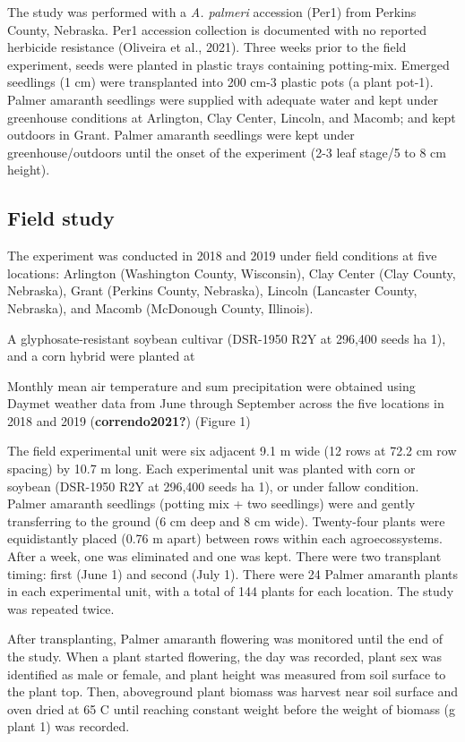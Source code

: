 \documentclass[utf8]{frontiersSCNS}
\begin{document}
The study was performed with a \emph{A. palmeri} accession (Per1) from
Perkins County, Nebraska. Per1 accession collection is documented with
no reported herbicide resistance (Oliveira et al., 2021). Three weeks
prior to the field experiment, seeds were planted in plastic trays
containing potting-mix. Emerged seedlings (1 cm) were transplanted into
200 cm-3 plastic pots (a plant pot-1). Palmer amaranth seedlings were
supplied with adequate water and kept under greenhouse conditions at
Arlington, Clay Center, Lincoln, and Macomb; and kept outdoors in Grant.
Palmer amaranth seedlings were kept under greenhouse/outdoors until the
onset of the experiment (2-3 leaf stage/5 to 8 cm height).

\hypertarget{field-study}{%
\subsection*{Field study}\label{field-study}}

The experiment was conducted in 2018 and 2019 under field conditions at
five locations: Arlington (Washington County, Wisconsin), Clay Center
(Clay County, Nebraska), Grant (Perkins County, Nebraska), Lincoln
(Lancaster County, Nebraska), and Macomb (McDonough County, Illinois).

A glyphosate-resistant soybean cultivar (DSR-1950 R2Y at 296,400 seeds
ha 1), and a corn hybrid were planted at

Monthly mean air temperature and sum precipitation were obtained using
Daymet weather data from June through September across the five
locations in 2018 and 2019 (\textbf{correndo2021?}) (Figure 1)

The field experimental unit were six adjacent 9.1 m wide (12 rows at
72.2 cm row spacing) by 10.7 m long. Each experimental unit was planted
with corn or soybean (DSR-1950 R2Y at 296,400 seeds ha 1), or under
fallow condition. Palmer amaranth seedlings (potting mix + two
seedlings) were and gently transferring to the ground (6 cm deep and 8
cm wide). Twenty-four plants were equidistantly placed (0.76 m apart)
between rows within each agroecossystems. After a week, one was
eliminated and one was kept. There were two transplant timing: first
(June 1) and second (July 1). There were 24 Palmer amaranth plants in
each experimental unit, with a total of 144 plants for each location.
The study was repeated twice.

After transplanting, Palmer amaranth flowering was monitored until the
end of the study. When a plant started flowering, the day was recorded,
plant sex was identified as male or female, and plant height was
measured from soil surface to the plant top. Then, aboveground plant
biomass was harvest near soil surface and oven dried at 65 C until
reaching constant weight before the weight of biomass (g plant 1) was
recorded.
\end{document}
